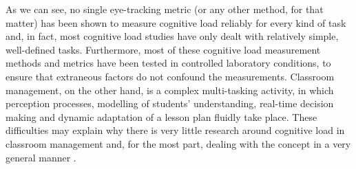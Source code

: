 \documentclass[10pt,journal,compsoc]{IEEEtran}
\begin{document}
As we can see, no single eye-tracking metric (or any other method, for that matter) has been shown to measure cognitive load reliably for every kind of task \cite{boucsein2000engineering} and, in fact, most cognitive load studies have only dealt with relatively simple, well-defined tasks. Furthermore, most of these cognitive load measurement methods and metrics have been tested in controlled laboratory conditions, to ensure that extraneous factors do not confound the measurements. Classroom management, on the other hand, is a complex multi-tasking activity, in which perception processes, modelling of students' understanding, real-time decision making and dynamic adaptation of a lesson plan fluidly take place. %
These difficulties may explain why there is very little research around cognitive load in classroom management and, for the most part, dealing with the concept in a very general manner \cite{feldon2007cognitive}. %

\end{document}

